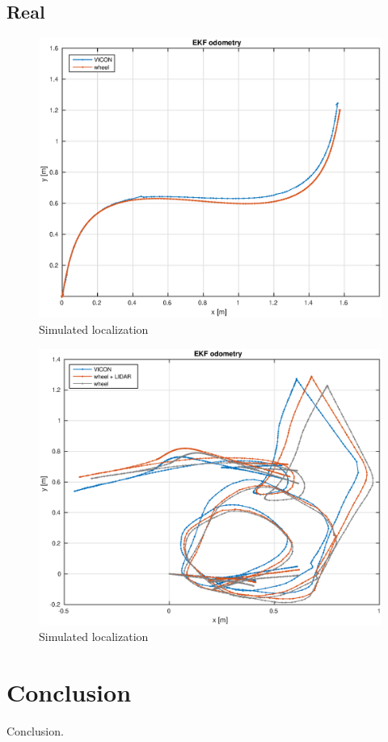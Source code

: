 \documentclass[times, utf8, diplomski, english]{fer}
\begin{document}
\section{Real}
\begin{figure}[h]
\centering
\includegraphics[width=.75\textwidth]{localization1}
\caption{Simulated localization}
\end{figure}
\begin{figure}[h]
\centering
\includegraphics[width=.75\textwidth]{thing_odometry_lidar}
\caption{Simulated localization}
\end{figure}





\chapter{Conclusion}
Conclusion.




\appendix
\end{document}
